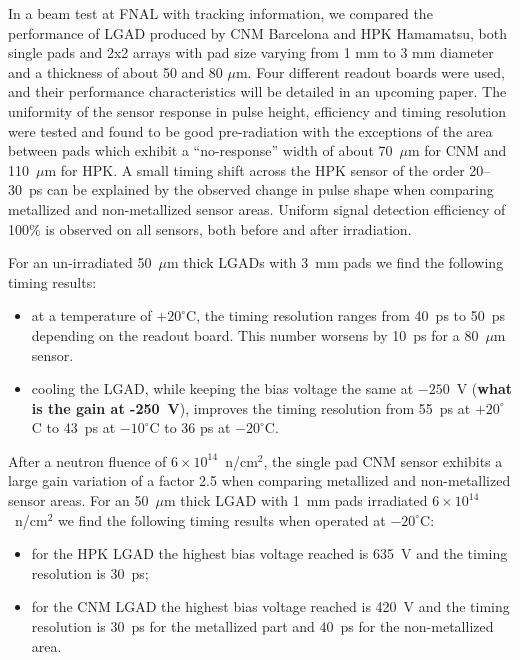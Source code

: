 \documentclass[preprint,1p]{elsarticle}
\begin{document}
In a beam test at FNAL with tracking information, we compared the performance of
LGAD produced by CNM Barcelona and HPK Hamamatsu, both single pads and 2x2
arrays with pad size varying from 1 mm to 3 mm diameter and a thickness of about
50 and 80 $\mu$m. Four different readout boards were used, and their performance
characteristics will be detailed in an upcoming paper. The uniformity of the
sensor response in pulse height, efficiency and timing resolution were tested
and found to be good pre-radiation with the exceptions of the area between pads
which exhibit a ``no-response'' width of about 70~$\mu$m for CNM and 110~$\mu$m
for HPK. A small timing shift across the HPK sensor of the order 20--30~ps can
be explained by the observed change in pulse shape when comparing metallized and
non-metallized sensor areas. Uniform signal detection efficiency of 100\% is
observed on all sensors, both before and after irradiation. 

For an un-irradiated 50~$\mu$m thick LGADs with 3~mm pads we find the following timing results: 
\begin{itemize}
  \item at a temperature of $+20^{\circ}$C, the timing resolution ranges from
        40~ps to 50~ps depending on the readout board. This number worsens by
        10~ps for a 80~$\mu$m sensor.
  \item cooling the LGAD, while keeping the bias voltage the same at $-250$~V
        (\textbf {what is the gain at -250~V}),
        improves the timing resolution from 55~ps at $+20^{\circ}$C to 43~ps at
        $-10^{\circ}$C to 36 ps at $-20^{\circ}$C. \end{itemize}

After a neutron fluence of $6\times 10^{14}$~n/cm$^2$, the single pad CNM sensor
exhibits a large gain variation of a factor 2.5 when comparing metallized and
non-metallized sensor areas. For an 50~$\mu$m thick LGAD with 1~mm pads
irradiated $6\times 10^{14}$~n/cm$^2$ we find the following timing results when
operated at $-20^{\circ}$C: 

\begin{itemize}
  \item for the HPK LGAD the highest bias voltage reached is 635~V and the timing resolution is 30~ps; 
  \item for the CNM LGAD the highest bias voltage reached is 420~V and the
        timing resolution is 30~ps for the metallized part and $40$~ps for the
        non-metallized area.
  
\end{itemize}
\end{document}
